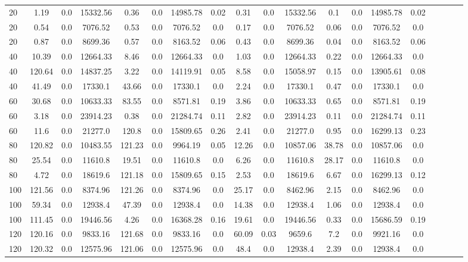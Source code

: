 \begin{sidewaystable}[!h]
\begin{tabular}{lcccccccccccccccccc}
20 & 1.19 & 0.0 & 15332.56 & 0.36 & 0.0 & 14985.78 & 0.02 & 0.31 & 0.0 & 15332.56 & 0.1 & 0.0 & 14985.78 & 0.02 \\
20 & 0.54 & 0.0 & 7076.52 & 0.53 & 0.0 & 7076.52 & 0.0 & 0.17 & 0.0 & 7076.52 & 0.06 & 0.0 & 7076.52 & 0.0 \\
20 & 0.87 & 0.0 & 8699.36 & 0.57 & 0.0 & 8163.52 & 0.06 & 0.43 & 0.0 & 8699.36 & 0.04 & 0.0 & 8163.52 & 0.06 \\
40 & 10.39 & 0.0 & 12664.33 & 8.46 & 0.0 & 12664.33 & 0.0 & 1.03 & 0.0 & 12664.33 & 0.22 & 0.0 & 12664.33 & 0.0 \\
40 & 120.64 & 0.0 & 14837.25 & 3.22 & 0.0 & 14119.91 & 0.05 & 8.58 & 0.0 & 15058.97 & 0.15 & 0.0 & 13905.61 & 0.08 \\
40 & 41.49 & 0.0 & 17330.1 & 43.66 & 0.0 & 17330.1 & 0.0 & 2.24 & 0.0 & 17330.1 & 0.47 & 0.0 & 17330.1 & 0.0 \\
60 & 30.68 & 0.0 & 10633.33 & 83.55 & 0.0 & 8571.81 & 0.19 & 3.86 & 0.0 & 10633.33 & 0.65 & 0.0 & 8571.81 & 0.19 \\
60 & 3.18 & 0.0 & 23914.23 & 0.38 & 0.0 & 21284.74 & 0.11 & 2.82 & 0.0 & 23914.23 & 0.11 & 0.0 & 21284.74 & 0.11 \\
60 & 11.6 & 0.0 & 21277.0 & 120.8 & 0.0 & 15809.65 & 0.26 & 2.41 & 0.0 & 21277.0 & 0.95 & 0.0 & 16299.13 & 0.23 \\
80 & 120.82 & 0.0 & 10483.55 & 121.23 & 0.0 & 9964.19 & 0.05 & 12.26 & 0.0 & 10857.06 & 38.78 & 0.0 & 10857.06 & 0.0 \\
80 & 25.54 & 0.0 & 11610.8 & 19.51 & 0.0 & 11610.8 & 0.0 & 6.26 & 0.0 & 11610.8 & 28.17 & 0.0 & 11610.8 & 0.0 \\
80 & 4.72 & 0.0 & 18619.6 & 121.18 & 0.0 & 15809.65 & 0.15 & 2.53 & 0.0 & 18619.6 & 6.67 & 0.0 & 16299.13 & 0.12 \\
100 & 121.56 & 0.0 & 8374.96 & 121.26 & 0.0 & 8374.96 & 0.0 & 25.17 & 0.0 & 8462.96 & 2.15 & 0.0 & 8462.96 & 0.0 \\
100 & 59.34 & 0.0 & 12938.4 & 47.39 & 0.0 & 12938.4 & 0.0 & 14.38 & 0.0 & 12938.4 & 1.06 & 0.0 & 12938.4 & 0.0 \\
100 & 111.45 & 0.0 & 19446.56 & 4.26 & 0.0 & 16368.28 & 0.16 & 19.61 & 0.0 & 19446.56 & 0.33 & 0.0 & 15686.59 & 0.19 \\
120 & 120.16 & 0.0 & 9833.16 & 121.68 & 0.0 & 9833.16 & 0.0 & 60.09 & 0.03 & 9659.6 & 7.2 & 0.0 & 9921.16 & 0.0 \\
120 & 120.32 & 0.0 & 12575.96 & 121.06 & 0.0 & 12575.96 & 0.0 & 48.4 & 0.0 & 12938.4 & 2.39 & 0.0 & 12938.4 & 0.0 \\

\end{tabular}
\end{sidewaystable}
